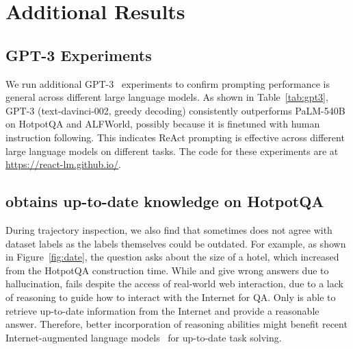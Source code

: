 \section{Additional Results}
\subsection{GPT-3 Experiments} 
\label{sec:gpt3}

We run additional GPT-3~\citep{brown2020language} experiments to confirm \model{} prompting performance is general across different large language models. As shown in Table~\ref{tab:gpt3}, GPT-3 (text-davinci-002, greedy decoding) consistently outperforms PaLM-540B on HotpotQA and ALFWorld, possibly because it is finetuned with human instruction following. This indicates ReAct prompting is effective across different large language models on different tasks.
The code for these experiments are at \url{https://react-lm.github.io/}.
\subsection{\model{} obtains up-to-date knowledge on HotpotQA}

During trajectory inspection, we also find that sometimes \model{} does not agree with dataset labels as the labels themselves could be outdated. For example, as shown in Figure~\ref{fig:date}, the question asks about the size of a hotel, which increased from the HotpotQA construction time. While \palm{} and \reason{} give wrong answers due to hallucination, \act{} fails despite the access of real-world web interaction, due to a lack of reasoning to guide how to interact with the Internet for QA. Only \model{} is able to retrieve up-to-date information from the Internet and provide a reasonable answer. Therefore, better incorporation of reasoning abilities might benefit recent Internet-augmented language models~\citep{nakano2021webgpt,lazaridou2022internet,shuster2022language} for up-to-date task solving. 
